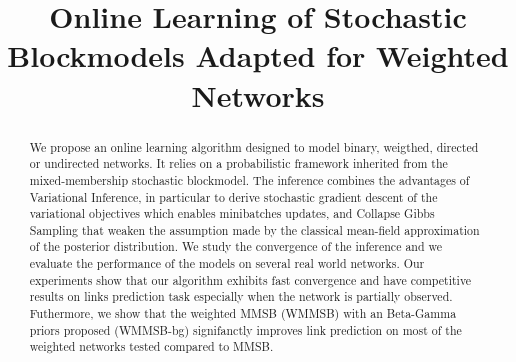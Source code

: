 \documentclass{article}
\begin{document}
\title{Online Learning of Stochastic Blockmodels Adapted for Weighted Networks}
	
\maketitle

\begin{abstract}
We propose an online learning algorithm designed to model binary, weigthed, directed or undirected networks. It relies on a probabilistic framework inherited from the mixed-membership stochastic blockmodel. The inference combines the advantages of Variational Inference, in particular to derive stochastic gradient descent of the variational objectives which enables minibatches updates, and Collapse Gibbs Sampling that weaken the assumption made by the classical mean-field approximation of the posterior distribution. We study the convergence of the inference and we evaluate the performance of the models on several real world networks. Our experiments show that our algorithm exhibits fast convergence and have competitive  results on links prediction task especially when the network is partially observed. Futhermore, we show that the weighted MMSB (WMMSB) with an Beta-Gamma priors proposed (WMMSB-bg) signifanctly improves link prediction on most of the weighted networks tested compared to MMSB.
\end{abstract}



%




\clearpage

%



\appendix

\end{document}
